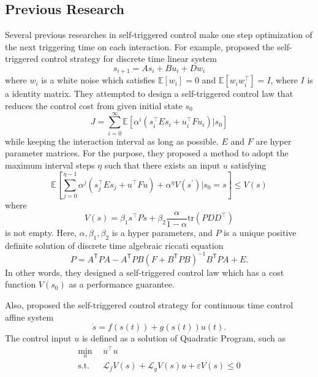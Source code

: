 \documentclass[english, dvipdfmx]{ampmt}             %
\newcommand{\expect}{\mathbb{E}}
\begin{document}
\subsection{Previous Research}
Several previous researches in self-triggered control make one step optimization of the next triggering time on each interaction. For example, \cite{STC} proposed the self-triggered control strategy for discrete time linear system
\begin{equation*}
	s_{i+1} = As_i + Bu_i + Dw_i
\end{equation*}
where $w_i$ is a white noise which satisfies $\expect[w_i] = 0$ and $\expect[w_iw_i^{\top}]=I$, where $I$  is a identity matrix.
They attempted to design a self-triggered control law that reduces the control cost from given initial state $s_0$
\begin{equation*}
	J = \sum_{i = 0}^{\infty}\expect[\alpha^i(s_i^{\top}Es_i+u_i^{\top}Fu_i)|s_0]
\end{equation*}
while keeping the interaction interval as long as possible. $E$ and $F$ are hyper parameter matrices. For the purpose, they proposed a method to adopt the maximum interval steps $\eta$ such that 
there exists an input $u$ satisfying
\begin{equation*}
	\expect[\sum_{j=0}^{\eta-1}\alpha^{j}(s_j^{\top}Es_j+u^{\top}Fu)+\alpha^{\eta}V(s^{\prime})|s_0=s] \leq V(s)
\end{equation*}
where
\begin{equation*}
	V(s) = \beta_1s^{\top}Ps + \beta_2\frac{\alpha}{1-\alpha}\textrm{tr}(PDD^{\top})
\end{equation*}
is not empty. Here, $\alpha, \beta_1, \beta_2$ is a hyper parameters, and $P$ is a unique positive definite solution of discrete time algebraic riccati equation 
\begin{equation*}
	P = A^\mathsf{T}PA-A^\mathsf{T}PB\left(F+B^\mathsf{T}PB\right)^{-1}B^\mathsf{T}PA+E.
\end{equation*}
In other words, they designed a self-triggered control law which has a cost function $V(s_0)$ as a performance guarantee. \par
Also, \cite{ECBF} proposed the self-triggered control strategy for continuous time control affine system 
\begin{equation*}
	\dot{s} = f(s(t)) + g(s(t))u(t).
\end{equation*}
The control input $u$ is defined as a solution of Quadratic Program, such as
\begin{align*}
	\min_{u}~~&u^{\top}u \\
	\textrm{s.t.}~~&\mathcal{L}_fV(s)+\mathcal{L}_gV(s)u+\varepsilon V(s)\leq 0
\end{align*}
\end{document}
